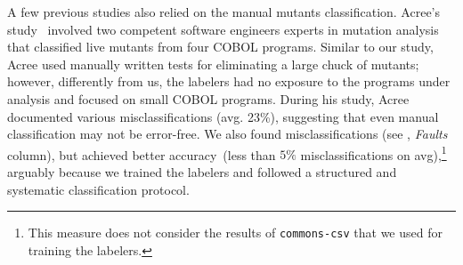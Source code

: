 \documentclass[sigconf,review,anonymous]{acmart}
\begin{document}
A few previous studies also relied on the manual mutants classification.
%
Acree's study~\cite{acree1980mutation} 
involved two competent software engineers experts in mutation analysis
that classified
live mutants from four COBOL programs.
Similar to our study, Acree used manually written tests
for eliminating a large chuck of mutants; however, differently 
from us, the labelers had no exposure to the programs under analysis and
focused on small COBOL programs.
%
During his study, Acree documented various misclassifications (avg. 23\%),
suggesting that even manual classification may not be error-free. 
%
We also found misclassifications (see , \emph{Faults} column),
but achieved better accuracy~(less than $5\%$ misclassifications on avg),\footnote{This measure does not consider the results of \texttt{commons-csv} that we used for training the labelers.}
arguably because we trained the labelers
and followed a structured and systematic classification protocol.
\end{document}
